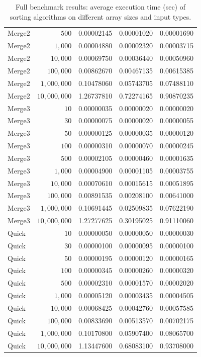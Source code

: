\begin{table}[h!]
\begin{tabularx}{\textwidth}{l r X X X}
Merge2 & $500$ & 0.00002145 & 0.00001020 & 0.00001690 \\
Merge2 & $1{,}000$ & 0.00004880 & 0.00002320 & 0.00003715 \\
Merge2 & $10{,}000$ & 0.00069750 & 0.00036440 & 0.00050960 \\
Merge2 & $100{,}000$ & 0.00862670 & 0.00467135 & 0.00615385 \\
Merge2 & $1{,}000{,}000$ & 0.10478060 & 0.05743705 & 0.07488110 \\
Merge2 & $10{,}000{,}000$ & 1.26737810 & 0.72274165 & 0.90870235 \\
\midrule
Merge3 & $10$ & 0.00000035 & 0.00000020 & 0.00000020 \\
Merge3 & $30$ & 0.00000075 & 0.00000020 & 0.00000055 \\
Merge3 & $50$ & 0.00000125 & 0.00000035 & 0.00000120 \\
Merge3 & $100$ & 0.00000310 & 0.00000070 & 0.00000245 \\
Merge3 & $500$ & 0.00002105 & 0.00000460 & 0.00001635 \\
Merge3 & $1{,}000$ & 0.00004900 & 0.00001105 & 0.00003755 \\
Merge3 & $10{,}000$ & 0.00070610 & 0.00015615 & 0.00051895 \\
Merge3 & $100{,}000$ & 0.00891535 & 0.00208100 & 0.00641000 \\
Merge3 & $1{,}000{,}000$ & 0.10691445 & 0.02509835 & 0.07622190 \\
Merge3 & $10{,}000{,}000$ & 1.27277625 & 0.30195025 & 0.91110060 \\
\midrule
Quick & $10$ & 0.00000050 & 0.00000050 & 0.00000030 \\
Quick & $30$ & 0.00000100 & 0.00000095 & 0.00000100 \\
Quick & $50$ & 0.00000195 & 0.00000120 & 0.00000165 \\
Quick & $100$ & 0.00000345 & 0.00000260 & 0.00000320 \\
Quick & $500$ & 0.00002310 & 0.00001570 & 0.00002020 \\
Quick & $1{,}000$ & 0.00005120 & 0.00003435 & 0.00004505 \\
Quick & $10{,}000$ & 0.00068425 & 0.00042760 & 0.00057585 \\
Quick & $100{,}000$ & 0.00833690 & 0.00513570 & 0.00702175 \\
Quick & $1{,}000{,}000$ & 0.10170800 & 0.05907400 & 0.08065700 \\
Quick & $10{,}000{,}000$ & 1.13447600 & 0.68083100 & 0.93708000 \\
\bottomrule
\end{tabularx}
\caption{Full benchmark results: average execution time (sec) of sorting algorithms on different array sizes and input types.}
\label{tab:bench-results}
\end{table}